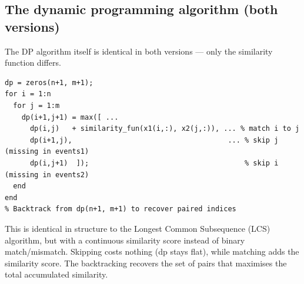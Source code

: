 \documentclass[11pt, a4paper]{article}
\begin{document}
\subsection{The dynamic programming algorithm (both versions)}

The DP algorithm itself is identical in both versions --- only the similarity function differs.

\begin{center}
\end{center}

\begin{lstlisting}[style=matlab, caption={DP recurrence (same in old and new versions)}]
dp = zeros(n+1, m+1);
for i = 1:n
  for j = 1:m
    dp(i+1,j+1) = max([ ...
      dp(i,j)   + similarity_fun(x1(i,:), x2(j,:)), ... % match i to j
      dp(i+1,j),                                     ... % skip j (missing in events1)
      dp(i,j+1)  ]);                                     % skip i (missing in events2)
  end
end
% Backtrack from dp(n+1, m+1) to recover paired indices
\end{lstlisting}

This is identical in structure to the Longest Common Subsequence (LCS) algorithm, but with a continuous similarity score instead of binary match/mismatch. Skipping costs nothing (dp stays flat), while matching adds the similarity score. The backtracking recovers the set of pairs that maximises the total accumulated similarity.
\end{document}
